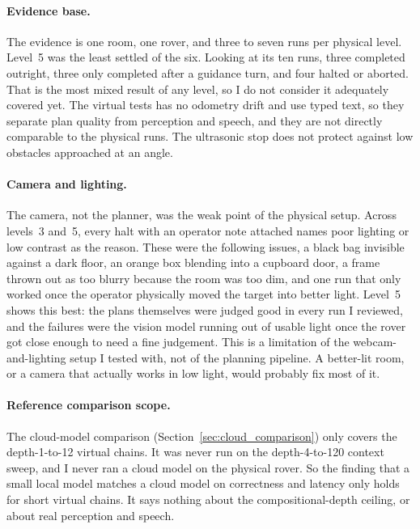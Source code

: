 \label{sec:contributions}

\label{sec:limitations}

\paragraph{Evidence base.} The evidence is one room, one rover, and three to
seven runs per physical level. Level~5 was the least settled of the six. Looking at 
its ten runs, three completed outright, three only completed after a guidance
turn, and four halted or aborted. That is the most mixed result of any level,
so I do not consider it adequately covered yet. The virtual tests has no odometry drift
and use typed text, so they separate plan quality from perception and
speech, and they are not directly comparable to the physical runs. The
ultrasonic stop does not protect against low obstacles approached at an
angle.

\paragraph{Camera and lighting.} The camera, not the planner, was the weak
point of the physical setup. Across levels~3 and~5, every halt with an
operator note attached names poor lighting or low contrast as the reason. These were the following
issues, a black bag invisible against a dark floor, an orange box blending into a
cupboard door, a frame thrown out as too blurry because the room was too dim,
and one run that only worked once the operator physically moved the target
into better light. Level~5 shows this best: the plans themselves were judged
good in every run I reviewed, and the failures were the vision model running
out of usable light once the rover got close enough to need a fine judgement.
This is a limitation of the webcam-and-lighting setup I tested with, not of
the planning pipeline. A better-lit room, or a camera that actually works in
low light, would probably fix most of it.

\paragraph{Reference comparison scope.} The cloud-model comparison
(Section~\ref{sec:cloud_comparison}) only covers the depth-1-to-12 virtual
chains. It was never run on the depth-4-to-120 context sweep, and I never ran
a cloud model on the physical rover. So the finding that a small local model
matches a cloud model on correctness and latency only holds for short virtual
chains. It says nothing about the compositional-depth ceiling, or about real
perception and speech.

